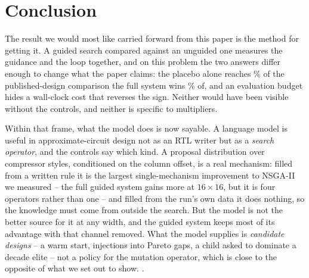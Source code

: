 \documentclass[acmsmall,review,anonymous]{acmart}
\begin{document}
\section{Conclusion}
The result we would most like carried forward from this paper is the method for
getting it.  A guided search compared against an unguided one measures the
guidance and the loop together, and on this problem the two answers differ
enough to change what the paper claims: the placebo alone reaches
\SotaShamSixteenADP\% of the published-design comparison the full system wins
\SotaSixteenADP\% of, and an evaluation budget hides a wall-clock cost that
reverses the sign.  Neither would have been visible without the controls, and
neither is specific to multipliers.

Within that frame, what the model does is now sayable.  A language model is
useful in approximate-circuit design not as an RTL writer but as a \emph{search
operator}, and the controls say which kind.  A proposal
distribution over compressor styles, conditioned on the column offset, is a
real mechanism: filled from a written rule it is the largest single-mechanism
improvement to NSGA-II we measured -- the full guided system gains more at
$16\times16$, but it is four operators rather than one -- and filled from the
run's own data it does nothing, so the knowledge must come from outside the
search.  But the model is not the
better source for it at any width, and the guided system keeps most of its
advantage with that channel removed.  What the model supplies is \emph{candidate
designs} -- a warm start, injections into Pareto gaps, a child asked to
dominate a decade elite -- not a policy for the mutation operator, which is
close to the opposite of what we set out to show.  \SixteenVerdict.
\end{document}
